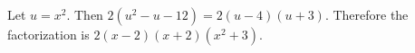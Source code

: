 Let $u=x^2$. Then $2(u^2-u-12)=2(u-4)(u+3)$. Therefore the factorization is $\boxed{2(x-2)(x+2)(x^2+3)}$.
